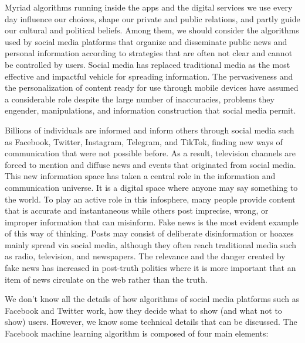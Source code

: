 Myriad algorithms running inside the apps and the digital services we use every day influence our choices, shape our private and public relations, and partly guide our cultural and political beliefs. Among them, we should consider the algorithms used by social media platforms that organize and disseminate public news and personal information according to strategies that are often not clear and cannot be controlled by users. Social media has replaced traditional media as the most effective and impactful vehicle for spreading information. The pervasiveness and the personalization of content ready for use through mobile devices have assumed a considerable role despite the large number of inaccuracies, problems they engender, manipulations, and information construction that social media permit.

Billions of individuals are informed and inform others through social media such as Facebook, Twitter, Instagram, Telegram, and TikTok, finding new ways of communication that were not possible before. As a result, television channels are forced to mention and diffuse news and events that originated from social media. This new information space has taken a central role in the information and communication universe. It is a digital space where anyone may say something to the world. To play an active role in this infosphere, many people provide content that is accurate and instantaneous while others post imprecise, wrong, or improper information that can misinform. Fake news is the most evident example of this way of thinking. Posts may consist of deliberate disinformation or hoaxes mainly spread via social media, although they often reach traditional media such as radio, television, and newspapers. The relevance and the danger created by fake news has increased in post-truth politics where it is more important that an item of news circulate on the web rather than the truth.

We don't know all the details of how algorithms of social media platforms such as Facebook and Twitter work, how they decide what to show (and what not to show) users. However, we know some technical details that can be discussed. The Facebook machine learning algorithm is composed of four main elements:

